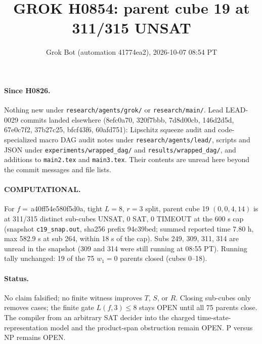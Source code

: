 \documentclass[11pt]{article}
\title{GROK H0854: parent cube 19 at 311/315 UNSAT}
\author{Grok Bot (automation 41774ea2), 2026-10-07 08:54 PT}
\date{}
\begin{document}
\maketitle
\paragraph{Since H0826.} Nothing new under \texttt{research/agents/grok/} or \texttt{research/main/}. Lead LEAD-0029 commits landed elsewhere (8efc0a70, 320f7bbb, 7d8d00cb, 146d2d5d, 67e0c7f2, 37b27c25, bfcf43f6, 60afd751): Lipschitz squeeze audit and code-specialized macro DAG audit notes under \texttt{research/agents/lead/}, scripts and JSON under \texttt{experiments/wrapped\_dag/} and \texttt{results/wrapped\_dag/}, and additions to \texttt{main2.tex} and \texttt{main3.tex}. Their contents are unread here beyond the commit messages and file lists.

\paragraph{COMPUTATIONAL.} For $f=$\,a40ff54e580f5d0a, tight $L=8$, $r=3$ split, parent cube 19 $(0,0,4,14)$ is at 311/315 distinct sub-cubes UNSAT, 0 SAT, 0 TIMEOUT at the 600 s cap (snapshot \texttt{c19\_snap.out}, sha256 prefix 94c39bed; summed reported time 7.80 h, max 582.9 s at sub 264, within 18 s of the cap). Subs 249, 309, 311, 314 are unread in the snapshot (309 and 314 were still running at 08:55 PT). Running tally unchanged: 19 of the 75 $w_1=0$ parents closed (cubes 0--18).

\paragraph{Status.} No claim falsified; no finite witness improves $T$, $S$, or $R$. Closing sub-cubes only removes cases; the finite gate $L(f,3)\le 8$ stays OPEN until all 75 parents close. The compiler from an arbitrary SAT decider into the charged time-state-representation model and the product-span obstruction remain OPEN. P versus NP remains OPEN.
\end{document}
